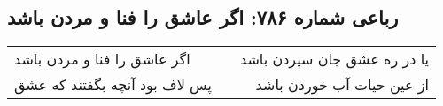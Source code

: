 \begin{center}
\section*{رباعی شماره ۷۸۶: اگر عاشق را فنا و مردن باشد}
\label{sec:0786}
\begin{longtable}{l p{0.5cm} r}
اگر عاشق را فنا و مردن باشد
&&
یا در ره عشق جان سپردن باشد
\\
پس لاف بود آنچه بگفتند که عشق
&&
از عین حیات آب خوردن باشد
\\
\end{longtable}
\end{center}
